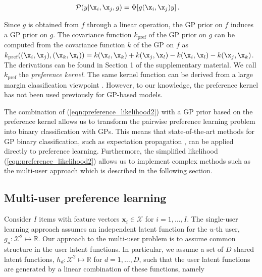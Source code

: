 \begin{align}
\mathcal{P}(y|\x_i,\x_j,g) &= \Phi[g(\x_i, \x_j)y]\,.\label{eqn:preference_likelihood2}
\end{align}

Since $g$ is obtained from $f$ through a linear operation, the GP prior on $f$ induces a GP prior on $g$.
The covariance function $k_\text{pref}$ of the GP prior on $g$ can be computed from the covariance function $k$ of the GP on $f$ as $k_\text{pref}((\x_i,\x_j),(\x_k,\x_l)) = k(\x_i,\x_k) + k(\x_j,\x_l) - k(\x_i,\x_l) - k(\x_j,\x_k)$. The derivations can be found in Section 1 of the supplementary material. We call $k_\text{pref}$ the \emph{preference kernel}. The same kernel function can be derived from a large margin classification viewpoint \cite{furnkranz2010}. However, to our knowledge, the preference kernel has not been used previously for GP-based models.	

The combination of (\ref{eqn:preference_likelihood2}) with a GP prior based on the preference kernel allows us to transform the pairwise preference learning problem into  binary classification with GPs. This means that state-of-the-art methods for GP binary classification, such as expectation propagation \cite{Minka2001}, can be applied directly to preference learning. Furthermore, the simplified likelihood (\ref{eqn:preference_likelihood2}) allows us to implement complex methods  such as the multi-user approach which is described in the following section.


\subsection{Multi-user preference learning}

Consider $I$ items with feature vectors $\mathbf{x}_i\in\mathcal{X}$ for $i=1,\ldots,I$.  The single-user learning approach assumes an independent latent function for the $u$-th user, $g_u:\mathcal{X}^2\mapsto\mathbb{R}$. Our approach to the multi-user problem is to assume common structure in the user latent functions. In particular, we assume a set of $D$ shared latent functions, $h_d:\mathcal{X}^2\mapsto \mathbb{R}$ for $d=1,\ldots,D$, such that the user latent functions are  generated by a linear combination of these functions, namely

